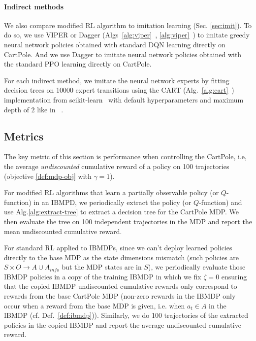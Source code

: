 \paragraph{Indirect methods} We also compare modified RL algorithm to imitation learning (Sec. \ref{sec:imit}).
To do so, we use VIPER or Dagger (Algs~\ref{alg:viper}~\cite{dagger}, \ref{alg:viper}~\cite{viper}) to imitate greedy neural network policies obtained with standard DQN learning directly on CartPole.
And we use Dagger to imitate neural network policies obtained with the standard PPO learning directly on CartPole. 

For each indirect method, we imitate the neural network experts by fitting decision trees on 10000 expert transitions using the CART (Alg.~\ref{alg:cart}~\cite{breiman1984classification}) implementation from scikit-learn~\cite{scikit-learn} with default hyperparameters and maximum depth of 2 like in ~\cite{topin2021iterative}.
    
\subsection{Metrics}
The key metric of this section is performance when controlling the CartPole, i.e, the average \textit{undiscounted} cumulative reward of a policy on 100 trajectories (objective \ref{def:mdp-obj} with $\gamma=1$).

For modified RL algorithms that learn a partially observable policy (or $Q$-function) in an IBMPD, we periodically extract the policy (or $Q$-function) and use Alg.\ref{alg:extract-tree} to extract a decision tree for the CartPole MDP. 
We then evaluate the tree on 100 independent trajectories in the MDP and report the mean undiscounted cumulative reward.

For standard RL applied to IBMDPs, since we can't deploy learned policies directly to the base MDP as the state dimensions mismatch (such policies are $S\times O\rightarrow A \cup A_{info}$ but the MDP states are in $S$), we periodically evaluate those IBMDP policies in a copy of the training IBMDP in which we fix $\zeta=0$ ensuring that the copied IBMDP undiscounted cumulative rewards only correspond to rewards from the base CartPole MDP (non-zero rewards in the IBMDP only occur when a reward from the base MDP is given, i.e. when $a_t\in A$ in the IBMDP (cf. Def.~\ref{def:ibmdp})).
Similarly, we do 100 trajectories of the extracted policies in the copied IBMDP and report the average undiscounted cumulative reward.

